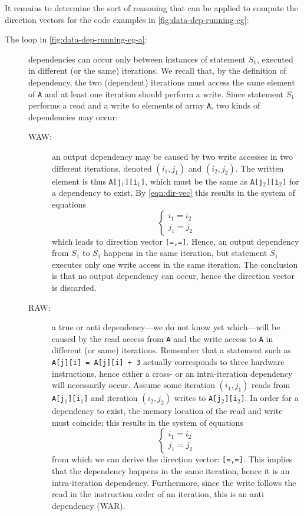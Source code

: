It remains to determine the sort of reasoning that can be applied to
compute the direction vectors for the code examples in
\cref{fig:data-dep-running-eg}:
\begin{description}
\item[The loop in \cref{fig:data-dep-running-eg-a}:] dependencies can
  occur only between instances of statement $S_1$, executed in
  different (or the same) iterations.  We recall that, by the
  definition of dependency, the two (dependent) iterations must access
  the same element of \texttt{A} and at least one iteration should
  perform a write.  Since statement $S_1$ performs a read and a write
  to elements of array \texttt{A}, two kinds of dependencies may
  occur:
  \begin{description}
  \item[WAW:] an output dependency may be caused by two write accesses
    in two different iterations, denoted $(i_1,j_1)$ and
    $(i_2,j_2)$. The written element is thus \texttt{A[j$_1$][i$_1$]},
    which must be the same as \texttt{A[j$_2$][i$_2$]} for a
    dependency to exist. By \cref{eqn:dir-vec} this results in the
    system of equations
    \[
      \begin{cases}i_1 = i_2\\j_1 = j_2\end{cases}
    \]
    which leads to direction vector \texttt{[=,=]}.  Hence, an output
    dependency from $S_1$ to $S_1$ happens in the same iteration, but
    statement $S_1$ executes only one write access in the same
    iteration.  The conclusion is that no output dependency can occur,
    hence the direction vector is discarded.
  \item[RAW:] a true or anti dependency---we do not know yet
    which---will be caused by the read access from \texttt{A} and the
    write access to \texttt{A} in different (or same)
    iterations. Remember that a statement such as \texttt{A[j][i] =
      A[j][i] + 3} actually corresponds to three hardware
    instructions, hence either a cross- or an intra-iteration
    dependency will necessarily occur.  Assume some iteration
    $(i_1, j_1)$ reads from \texttt{A[j$_1$][i$_1$]} and iteration
    $(i_2,j_2)$ writes to \texttt{A[j$_2$][i$_2$]}.  In order for a
    dependency to exist, the memory location of the read and write
    must coincide; this results in the system of equations
    \[
      \begin{cases}i_1 = i_2\\j_1 = j_2\end{cases}
    \]
    from which we can derive the direction vector:
    \texttt{[=,=]}. This implies that the dependency happens in the
    same iteration, hence it is an intra-iteration dependency.
    Furthermore, since the write follows the read in the instruction
    order of an iteration, this is an anti dependency (WAR).
  \end{description}


\end{description}
